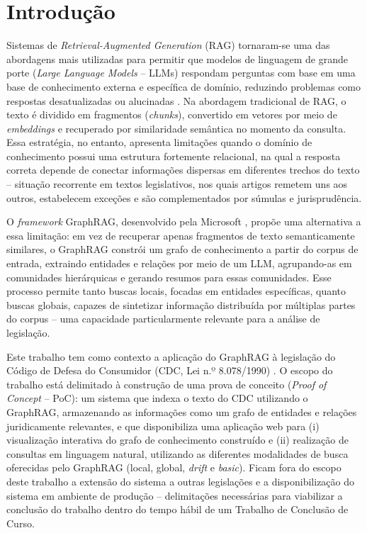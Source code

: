 \chapter{Introdução}
\label{sec-intro}

Sistemas de \textit{Retrieval-Augmented Generation} (RAG) tornaram-se uma das
abordagens mais utilizadas para permitir que modelos de linguagem de grande
porte (\textit{Large Language Models} -- LLMs) \cite{vaswani2017attention, brown2020language} respondam perguntas com base em
uma base de conhecimento externa e específica de domínio, reduzindo problemas
como respostas desatualizadas ou alucinadas \cite{lewis2020retrieval}. Na abordagem tradicional de RAG, o texto é dividido em fragmentos
(\textit{chunks}), convertido em vetores por meio de \textit{embeddings} e
recuperado por similaridade semântica no momento da consulta. Essa estratégia,
no entanto, apresenta limitações quando o domínio de conhecimento possui uma
estrutura fortemente relacional, na qual a resposta correta depende de conectar
informações dispersas em diferentes trechos do texto -- situação recorrente em
textos legislativos, nos quais artigos remetem uns aos outros, estabelecem
exceções e são complementados por súmulas e jurisprudência.

O \textit{framework} GraphRAG, desenvolvido pela Microsoft \cite{edge2024global}, propõe uma alternativa a essa limitação: em vez de recuperar apenas
fragmentos de texto semanticamente similares, o GraphRAG constrói um grafo de
conhecimento a partir do corpus de entrada, extraindo entidades e relações por
meio de um LLM, agrupando-as em comunidades hierárquicas e gerando resumos para
essas comunidades. Esse processo permite tanto buscas locais, focadas em
entidades específicas, quanto buscas globais, capazes de sintetizar informação
distribuída por múltiplas partes do corpus -- uma capacidade particularmente
relevante para a análise de legislação.

Este trabalho tem como contexto a aplicação do GraphRAG à legislação do Código
de Defesa do Consumidor (CDC, Lei n.º 8.078/1990) \cite{brasil1990cdc}. O escopo do trabalho está
delimitado à construção de uma prova de conceito (\textit{Proof of Concept} --
PoC): um sistema que indexa o texto do CDC utilizando o GraphRAG, armazenando
as informações como um grafo de entidades e relações juridicamente
relevantes, e que disponibiliza uma aplicação web para (i) visualização
interativa do grafo de conhecimento construído e (ii) realização de consultas
em linguagem natural, utilizando as diferentes modalidades de busca oferecidas
pelo GraphRAG (local, global, \textit{drift} e \textit{basic}). Ficam fora do
escopo deste trabalho a extensão do sistema a outras legislações e a disponibilização do
sistema em ambiente de produção -- delimitações necessárias para viabilizar a
conclusão do trabalho dentro do tempo hábil de um Trabalho de Conclusão de
Curso.

